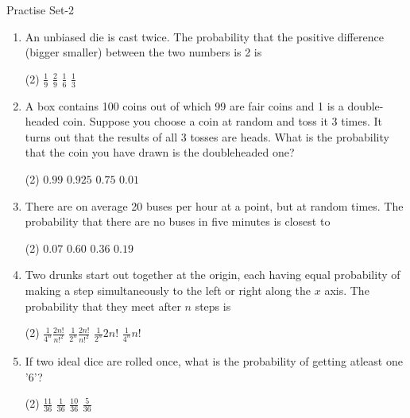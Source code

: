 \newpage
\begin{abox}
	Practise Set-2
\end{abox}
\begin{enumerate}[label=\color{ocre}\textbf{\arabic*.}]
		\item An unbiased die is cast twice. The probability that the positive difference (bigger smaller) between the two numbers is 2 is
	{}
	\begin{tasks}(2)
		\task[\textbf{a.}]$\frac{1}{9}$
		\task[\textbf{b.}]$\frac{2}{9}$
		\task[\textbf{c.}] $\frac{1}{6}$
		\task[\textbf{d.}] $\frac{1}{3}$
	\end{tasks}
	\item A box contains 100 coins out of which 99 are fair coins and 1 is a double-headed coin. Suppose you choose a coin at random and toss it 3 times. It turns out that the results of all 3 tosses are heads. What is the probability that the coin you have drawn is the doubleheaded one?
	{}
	\begin{tasks}(2)
		\task[\textbf{a.}] $0.99$
		\task[\textbf{b.}]$0.925$
		\task[\textbf{c.}] $0.75$
		\task[\textbf{d.}] $0.01$
	\end{tasks}
	\item There are on average 20 buses per hour at a point, but at random times. The probability that there are no buses in five minutes is closest to
	{}
	\begin{tasks}(2)
		\task[\textbf{a.}]$0.07$
		\task[\textbf{b.}] $0.60$
		\task[\textbf{c.}]$0.36$
		\task[\textbf{d.}] $0.19$
	\end{tasks}
	\item Two drunks start out together at the origin, each having equal probability of making a step simultaneously to the left or right along the $x$ axis. The probability that they meet after $n$ steps is
	{}
	\begin{tasks}(2)
		\task[\textbf{a.}]$\frac{1}{4^{n}} \frac{2 n !}{n !^{2}}$
		\task[\textbf{b.}] $\frac{1}{2^{n}} \frac{2 n !}{n !^{2}}$
		\task[\textbf{c.}] $\frac{1}{2^{n}} 2 n !$
		\task[\textbf{d.}]  $\frac{1}{4^{n}} n !$
	\end{tasks}
	\item If two ideal dice are rolled once, what is the probability of getting atleast one '6'?
	{}
	\begin{tasks}(2)
		\task[\textbf{a.}]$\frac{11}{36}$
		\task[\textbf{b.}]$\frac{1}{36}$
		\task[\textbf{c.}]$\frac{10}{36}$
		\task[\textbf{d.}]  $\frac{5}{36}$

\end{tasks}
\end{enumerate}
